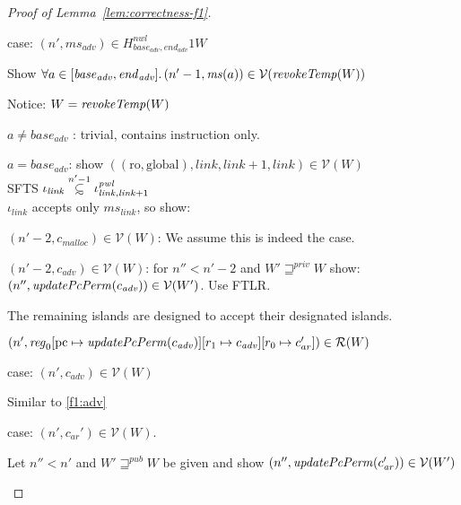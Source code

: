 \documentclass[a4paper]{article}
\newcommand{\update}[2]{[#1 \mapsto #2]}
\newcommand\subsetsim{\mathrel{\ooalign{\raise.2ex\hbox{$\subset$}\cr
      \hidewidth\lower.8ex\hbox{\scalebox{0.9}{$\sim$}}\hidewidth\cr}}}
\newcommand{\nsubsim}[1][n]{\stackrel{\tiny{#1}}{\subsetsim}}
\newcommand{\var}[1]{\mathit{#1}}
\newcommand{\hs}{\var{ms}}
\newcommand{\ms}{\hs}
\newcommand{\pcreg}{\mathrm{pc}}
\newcommand{\start}{\var{base}}
\newcommand{\addrend}{\var{end}}
\newcommand{\reg}{\var{reg}}
\newcommand{\adv}{\var{adv}}
\newcommand{\link}{\var{link}}
\newcommand{\nwl}{\var{nwl}}
\newcommand{\pwl}{\var{pwl}}
\newcommand{\plainfun}[2]{
  \ifthenelse{\equal{#2}{}}
  {\mathit{#1}}
  {\mathit{#1}(#2)}
}
\newcommand{\updatePcPerm}[1]{\plainfun{updatePcPerm}{#1}}
\newcommand{\revokeTemp}[1]{\plainfun{revokeTemp}{#1}}
\newcommand{\futurewk}{\mathbin{\sqsupseteq}^{\var{pub}}}
\newcommand{\futurestr}{\mathbin{\sqsupseteq}^{\var{priv}}}
\newcommand{\codelabel}[1]{\mathit{#1}}
\newcommand{\malloc}{\codelabel{malloc}}
\newcommand{\asmType}{\plaindom{AsmType}}
\newcommand{\plaindom}[1]{\mathrm{#1}}
\newcommand{\intr}[2]{\mathcal{#1}}
\newcommand{\valueintr}[1]{\intr{V}{#1}}
\newcommand{\regintr}[1]{\intr{R}{#1}}
\newcommand{\stdvr}{\valueintr{\asmType}}
\newcommand{\stdrr}{\regintr{\asmType}}
\newcommand{\npair}[2][n]{\left(#1,#2 \right)}
\newcommand{\plainperm}[1]{\mathrm{#1}}
\newcommand{\readonly}{\plainperm{ro}}
\newcommand{\glob}{\plainperm{global}}
\begin{document}
\begin{proof}[Proof of Lemma~\ref{lem:correctness-f1}]
\begin{enumproof}[resume]
\begin{enumproof}
\begin{enumproof}
      \item case: $\npair[n']{\ms_\adv} \in H^\nwl_{\start_\adv,\addrend_\adv} 1 W$ \label{lem:f1-adv-mem-sat}
        \begin{enumproof}
        \item Show $\forall a \in [\start_\adv,\addrend_\adv] \ldotp \npair[n'-1]{\ms(a)} \in \stdvr(\revokeTemp{W})$
        \item Notice: $W = \revokeTemp{W}$
        \end{enumproof}
        \begin{enumproof}
        \item $a \neq \start_\adv$ : trivial, contains instruction only.
        \item $a = \start_\adv$: show $((\readonly,\glob),\link,\link+1,\link) \in \stdvr(W)$\\
          SFTS $\iota_{\link} \nsubsim[n'-1] \iota^\pwl_{\link,\link+1}$\\
          $\iota_{\link}$ accepts only $\ms_\link$, so show:
          \begin{enumproof}
          \item $\npair[n'-2]{c_\malloc} \in \stdvr(W)$: We assume this is indeed the case.
          \item $\npair[n'-2]{c_\adv} \in \stdvr(W)$: for $n'' < n'-2$ and $W' \futurestr W$ show: \\$\npair[n'']{\updatePcPerm{c_\adv}} \in \stdvr(W')$. Use FTLR. \label{f1:adv}
          \end{enumproof}
        \end{enumproof}
      \item The remaining islands are designed to accept their designated islands.
      \end{enumproof}
    \end{enumproof}
  \item $\npair[n']{\reg_0\update{\pcreg}{\updatePcPerm{c_{\var{adv}}}}\update{r_1}{c_{\var{adv}}}\update{r_0}{c_{ar}'}} \in \stdrr(W)$
    \begin{enumproof}
    \item case: $\npair[n']{c_{\var{adv}}} \in \stdvr(W)$
      \begin{enumproof}
      \item Similar to \ref{f1:adv}
      \end{enumproof}
    \item case: $\npair[n']{c_{\var{ar}}'} \in \stdvr(W)$.
      \begin{enumproof}
      \item Let $n'' < n'$ and $W' \futurewk W$ be given and show $\npair[n'']{\updatePcPerm{c_{\var{ar}}'}} \in \stdvr(W')$\\

\end{enumproof}
\end{enumproof}
\end{enumproof}
\end{proof}
\end{document}
